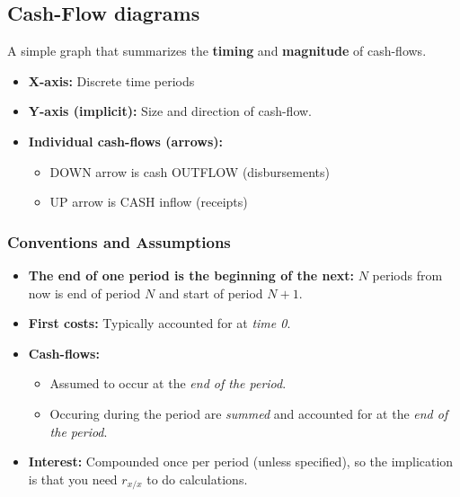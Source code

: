 \subsection{Cash-Flow diagrams}
\begin{definition}
    A simple graph that summarizes the \textbf{timing} and \textbf{magnitude} of cash-flows.
    \begin{itemize}
        \item \textbf{X-axis:} Discrete time periods
        \item \textbf{Y-axis (implicit):} Size and direction of cash-flow.
        \item \textbf{Individual cash-flows (arrows):} 
            \begin{itemize}
                \item DOWN arrow is cash OUTFLOW (disbursements)
                \item UP arrow is CASH inflow (receipts)
            \end{itemize}
    \end{itemize}
\end{definition}

    \subsubsection{Conventions and Assumptions}
    \begin{warning}
        \begin{itemize}
            \item \textbf{The end of one period is the beginning of the next:} $N$ periods from now is end of period $N$ and start of period $N+1$.
            \item \textbf{First costs:} Typically accounted for at \emph{time 0}.
            \item \textbf{Cash-flows:} 
            \begin{itemize}
                \item Assumed to occur at the \emph{end of the period}.
                \item Occuring during the period are \emph{summed} and accounted for at the \emph{end of the period}.
            \end{itemize}
            \item \textbf{Interest:} Compounded once per period (unless specified), so the implication is that you need $r_{x/x}$ to do calculations.
        \end{itemize}
    \end{warning}


